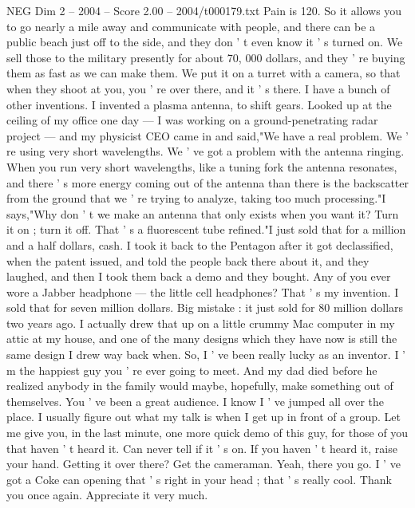 \begin{textsample}{NEG Dim 2 – 2004 – Score 2.00 – 2004/t000179.txt}
Pain is 120.
So it allows you to go nearly a mile away and communicate with people, and there can be a public beach just off to the side, and they don ' t even know it ' s turned on.
We sell those to the military presently for about 70, 000 dollars, and they ' re buying them as fast as we can make them.
We put it on a turret with a camera, so that when they shoot at you, you ' re over there, and it ' s there.
I have a bunch of other inventions.
I invented a plasma antenna, to shift gears.
Looked up at the ceiling of my office one day — I was working on a ground-penetrating radar project — and my physicist CEO came in and said,"We have a real problem.
We ' re using very short wavelengths.
We ' ve got a problem with the antenna ringing.
When you run very short wavelengths, like a tuning fork the antenna resonates, and there ' s more energy coming out of the antenna than there is the backscatter from the ground that we ' re trying to analyze, taking too much processing."I says,"Why don ' t we make an antenna that only exists when you want it?
Turn it on ; turn it off.
That ' s a fluorescent tube refined."I just sold that for a million and a half dollars, cash.
I took it back to the Pentagon after it got declassified, when the patent issued, and told the people back there about it, and they laughed, and then I took them back a demo and they bought.
Any of you ever wore a Jabber headphone — the little cell headphones?
That ' s my invention.
I sold that for seven million dollars.
Big mistake : it just sold for 80 million dollars two years ago.
I actually drew that up on a little crummy Mac computer in my attic at my house, and one of the many designs which they have now is still the same design I drew way back when.
So, I ' ve been really lucky as an inventor.
I ' m the happiest guy you ' re ever going to meet.
And my dad died before he realized anybody in the family would maybe, hopefully, make something out of themselves.
You ' ve been a great audience.
I know I ' ve jumped all over the place.
I usually figure out what my talk is when I get up in front of a group.
Let me give you, in the last minute, one more quick demo of this guy, for those of you that haven ' t heard it.
Can never tell if it ' s on.
If you haven ' t heard it, raise your hand.
Getting it over there?
Get the cameraman.
Yeah, there you go.
I ' ve got a Coke can opening that ' s right in your head ; that ' s really cool.
Thank you once again.
Appreciate it very much.

\end{textsample}
